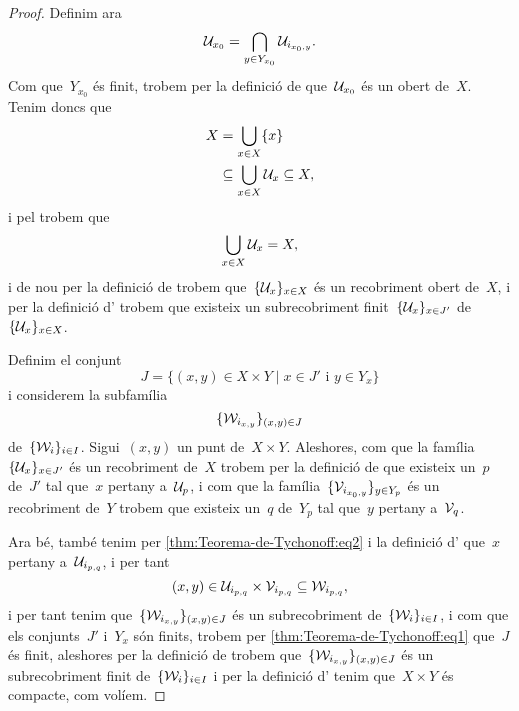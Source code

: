 \documentclass[../topologia.tex]{subfiles}
\begin{document}
\begin{proof}
        Definim ara
        \begin{equation}
            \label{thm:Teorema-de-Tychonoff:eq2}
            \mathcal{U}_{x_{0}}=\bigcap_{y\in Y_{x_{0}}}\mathcal{U}_{i_{x_{0},y}}.
        \end{equation}
        Com que~\(Y_{x_{0}}\) és finit, trobem per la definició de  que~\(\mathcal{U}_{x_{0}}\) és un obert de~\(X\).
        Tenim doncs que
        \begin{align*}
            X&=\bigcup_{x\in X}\{x\} \\
            &\subseteq\bigcup_{x\in X}\mathcal{U}_{x}\subseteq X,
        \end{align*}
        i pel  trobem que
        \[
            \bigcup_{x\in X}\mathcal{U}_{x}=X,
        \]
        i de nou per la definició de  trobem que~\(\{\mathcal{U}_{x}\}_{x\in X}\) és un recobriment obert de~\(X\), i per la definició d' trobem que existeix un subrecobriment finit~\(\{\mathcal{U}_{x}\}_{x\in J'}\) de~\(\{\mathcal{U}_{x}\}_{x\in X}\).

        Definim el conjunt
        \begin{equation}
            \label{thm:Teorema-de-Tychonoff:eq1}
            J=\{(x,y)\in X\times Y\mid x\in J'\text{ i }y\in Y_{x}\}
        \end{equation}
        i considerem la subfamília
        \[
            \{\mathcal{W}_{i_{x,y}}\}_{(x,y)\in J}
        \]
        de~\(\{\mathcal{W}_{i}\}_{i\in I}\).
        Sigui~\((x,y)\) un punt de~\(X\times Y\).
        Aleshores, com que la família~\(\{\mathcal{U}_{x}\}_{x\in J'}\) és un recobriment de~\(X\) trobem per la definició de  que existeix un~\(p\) de~\(J'\) tal que~\(x\) pertany a~\(\mathcal{U}_{p}\), i com que la família~\(\{\mathcal{V}_{i_{x_{0},y}}\}_{y\in Y_{p}}\) és un recobriment de~\(Y\) trobem que existeix un~\(q\) de~\(Y_{p}\) tal que~\(y\) pertany a~\(\mathcal{V}_{q}\).

        Ara bé, també tenim per \eqref{thm:Teorema-de-Tychonoff:eq2} i la definició d' que~\(x\) pertany a~\(\mathcal{U}_{i_{p,q}}\), i per tant
        \[
            (x,y)\in\mathcal{U}_{i_{p,q}}\times\mathcal{V}_{i_{p,q}}\subseteq\mathcal{W}_{i_{p,q}},
        \]
        i per tant tenim que~\(\{\mathcal{W}_{i_{x,y}}\}_{(x,y)\in J}\) és un subrecobriment de~\(\{\mathcal{W}_{i}\}_{i\in I}\), i com que els conjunts~\(J'\) i~\(Y_{x}\) són finits, trobem per \eqref{thm:Teorema-de-Tychonoff:eq1} que~\(J\) és finit, aleshores per la definició de  trobem que~\(\{\mathcal{W}_{i_{x,y}}\}_{(x,y)\in J}\) és un subrecobriment finit de~\(\{\mathcal{W}_{i}\}_{i\in I}\) i per la definició d' tenim que~\(X\times Y\) és compacte, com volíem.
    \end{proof}
\end{document}
